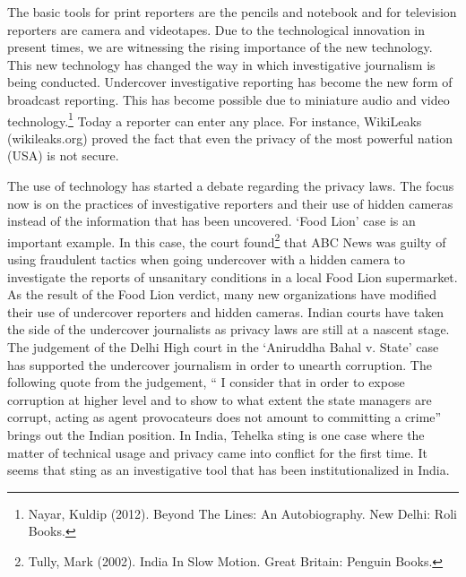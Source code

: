 \begin{multicols}{2}
\noi
The basic tools for print reporters are the pencils and notebook and for television reporters are
camera and videotapes. Due to the technological innovation in present times, we are witnessing
the rising importance of the new technology. This new technology has changed the way in
which investigative journalism is being conducted. Undercover investigative reporting has
become the new form of broadcast reporting. This has become possible due to miniature audio
and video technology.\footnote{Nayar, Kuldip (2012). Beyond The Lines: An Autobiography. New Delhi: Roli Books.} Today a reporter can enter any place. For instance, WikiLeaks
(wikileaks.org) proved the fact that even the privacy of the most powerful nation (USA) is not
secure.


\noi
The use of technology has started a debate regarding the privacy laws. The focus now is on the
practices of investigative reporters and their use of hidden cameras instead of the information
that has been uncovered. ‘Food Lion’ case is an important example. In this case, the court
found\footnote{Tully, Mark (2002). India In Slow Motion. Great Britain: Penguin Books.} that ABC News was guilty of using fraudulent tactics when going undercover with a
hidden camera to investigate the reports of unsanitary conditions in a local Food Lion
supermarket. As the result of the Food Lion verdict, many new organizations have modified
their use of undercover reporters and hidden cameras. Indian courts have taken the side of the
undercover journalists as privacy laws are still at a nascent stage. The judgement of the Delhi High court in the ‘Aniruddha Bahal v. State’ case has supported the undercover journalism in
order to unearth corruption. The following quote from the judgement, “ I consider that in order
to expose corruption at higher level and to show to what extent the state managers are corrupt,
acting as agent provocateurs does not amount to committing a crime” brings out the Indian
position. In India, Tehelka sting is one case where the matter of technical usage and privacy
came into conflict for the first time. It seems that sting as an investigative tool that has been
institutionalized in India.


\end{multicols}
